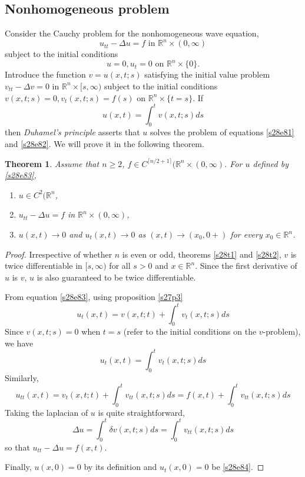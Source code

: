 \documentclass{article}
\theoremstyle{plain}
\newtheorem{thm}{Theorem}
\numberwithin{thm}{section}
\theoremstyle{plain}
\numberwithin{prop}{section}
\theoremstyle{definition}
\numberwithin{defn}{section}
\theoremstyle{remark}
\numberwithin{equation}{section}
\begin{document}
\subsection{Nonhomogeneous problem}
Consider the Cauchy problem for the nonhomogeneous wave equation,
\begin{equation}\label{s28e81}
u_{tt} - \Delta u = f \text{ in } \mathbb{R}^n \times (0, \infty)
\end{equation}
subject to the initial conditions
\begin{equation}\label{s28e82}
u = 0, u_t = 0 \text{ on } \mathbb{R}^n \times \{0\}.
\end{equation}
Introduce the function $v = u(x,t;s)$ satisfying the initial value problem $v_{tt} - \Delta v = 0$ in $\mathbb{R}^n
\times [s, \infty)$ subject to the initial conditions $v(x,t;s) = 0, v_t(x,t;s) = f(s)$ on $\mathbb{R}^n \times
\{t=s\}$. If 
\begin{equation}\label{s28e83}
u(x, t) = \int_0^t v(x,t;s)ds
\end{equation}
then \emph{Duhamel's principle} asserts that $u$ solves the problem of equations \eqref{s28e81} and \eqref{s28e82}.
We will prove it in the following theorem.
\begin{thm}\label{s28t3}
Assume that $n \ge 2$, $f \in C^{\lceil{n/2}+1\rceil}(\mathbb{R}^n \times (0, \infty)$. For $u$ defined by 
\eqref{s28e83},
\begin{enumerate}
\item $u \in C^2(\mathbb{R}^n$,
\item $u_{tt} - \Delta u = f$ in $\mathbb{R}^n \times (0, \infty)$,
\item $u(x,t) \rightarrow 0$ and $u_t(x,t) \rightarrow 0$ as $(x,t) \rightarrow (x_0, 0+)$ for every $x_0 \in
\mathbb{R}^n$.
\end{enumerate}
\end{thm}
\begin{proof}
Irrespective of whether $n$ is even or odd, theorems \ref{s28t1} and \ref{s28t2}, $v$ is twice differentiable in $
[s, \infty)$ for all $s > 0$ and $x \in \mathbb{R}^n$. Since the first derivative of $u$ is $v$, $u$ is also 
guaranteed to be twice differentiable.

From equation \eqref{s28e83}, using proposition \ref{s27p3}
\[
u_t(x,t) = v(x,t;t) + \int_0^t v_t(x,t;s)ds 
\]
Since $v(x,t;s) = 0$ when $t=s$ (refer to the initial conditions on the $v$-problem), we have
\begin{equation}\label{s28e84}
u_t(x,t) = \int_0^t v_t(x,t;s)ds
\end{equation}
Similarly,
\[
u_{tt}(x,t) = v_t(x,t;t) + \int_0^t v_{tt}(x,t;s)ds = f(x,t) + \int_0^t v_{tt}(x,t;s)ds
\]
Taking the laplacian of $u$ is quite straightforward,
\[
\Delta u = \int_0^t \delta v(x,t;s)ds = \int_0^t v_{tt}(x,t;s)ds
\]
so that $u_{tt} - \Delta u = f(x,t)$.

Finally, $u(x,0) = 0$ by its definition and $u_t(x,0) = 0$ be \eqref{s28e84}.
\end{proof}
\end{document}
